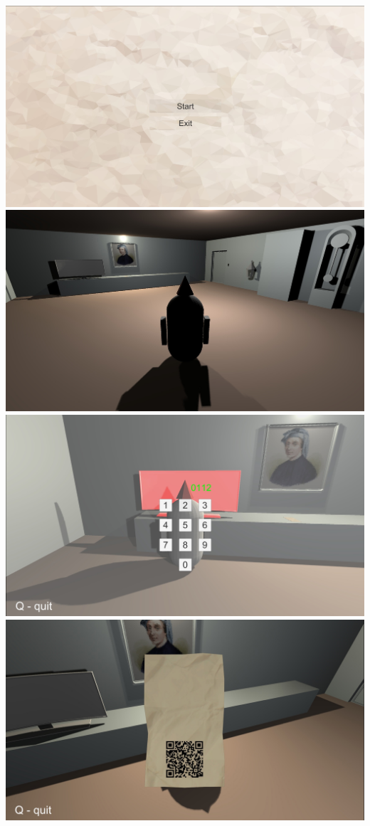 \pagebreak
{}
\\
\noindent
\includegraphics[scale=0.3]{images/21.jpg} \\
\includegraphics[scale=0.3]{images/22.jpg} \\
\includegraphics[scale=0.3]{images/23.jpg} \\
\includegraphics[scale=0.3]{images/24.jpg} \\
